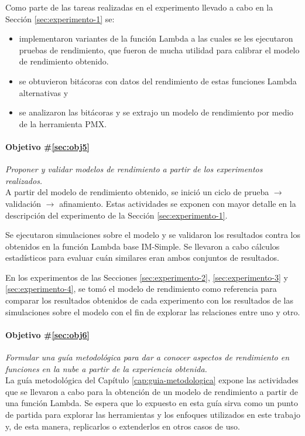 Como parte de las tareas realizadas en el experimento llevado a cabo en la Sección \ref{sec:experimento-1} se:
\begin{itemize}
    \item implementaron variantes de la función Lambda a las cuales se les ejecutaron pruebas de rendimiento, que fueron de mucha utilidad para calibrar el modelo de rendimiento obtenido.
    \item se obtuvieron bitácoras con datos del rendimiento de estas funciones Lambda alternativas y
    \item se analizaron las bitácoras y se extrajo un modelo de rendimiento por medio de la herramienta PMX.
\end{itemize}


\paragraph{Objetivo \#\ref{sec:obj5}} \emph{Proponer y validar modelos de rendimiento a partir de los experimentos realizados.}\\
A partir del modelo de rendimiento obtenido, se inició un ciclo de prueba $\rightarrow$ validación $\rightarrow$ afinamiento. Estas actividades se exponen con mayor detalle en la descripción del experimento de la Sección \ref{sec:experimento-1}.

Se ejecutaron simulaciones sobre el modelo y se validaron los resultados contra los obtenidos en la función Lambda base IM-Simple. Se llevaron a cabo cálculos estadísticos para evaluar cuán similares eran ambos conjuntos de resultados.

En los experimentos de las Secciones \ref{sec:experimento-2}, \ref{sec:experimento-3} y \ref{sec:experimento-4}, se tomó el modelo de rendimiento como referencia para comparar los resultados obtenidos de cada experimento con los resultados de las simulaciones sobre el modelo con el fin de explorar las relaciones entre uno y otro.

\paragraph{Objetivo \#\ref{sec:obj6}} \emph{Formular una guía metodológica para dar a conocer aspectos de rendimiento en funciones en la nube a partir de la experiencia obtenida.}\\
La guía metodológica del Capítulo \ref{cap:guia-metodologica} expone las actividades que se llevaron a cabo para la obtención de un modelo de rendimiento a partir de una función Lambda. Se espera que lo expuesto en esta guía sirva como un punto de partida para explorar las herramientas y los enfoques utilizados en este trabajo y, de esta manera, replicarlos o extenderlos en otros casos de uso.


